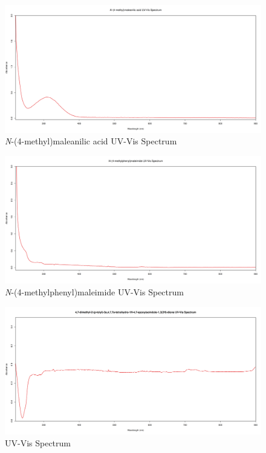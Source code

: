 \documentclass[11pt]{article}
\begin{document}
\begin{figure}[H]
    \centering
    \includegraphics[scale=0.33]{spectra/uvvis10.1.png}
    \caption{\textit{N}-(4-methyl)maleanilic acid UV-Vis Spectrum}
\end{figure}
\begin{figure}[H]
    \centering
    \includegraphics[scale=0.33]{spectra/uvvis10.2.png}
    \caption{\textit{N}-(4-methylphenyl)maleimide UV-Vis Spectrum}
\end{figure}
\begin{figure}[H]
    \centering
    \includegraphics[scale=0.33]{spectra/uvvis10.3.png}
    \caption{ UV-Vis Spectrum}
\end{figure}
\end{document}
